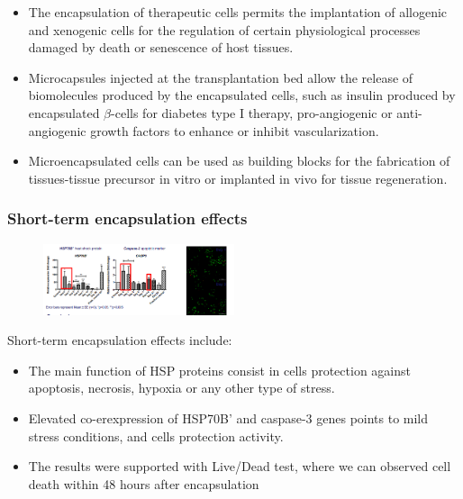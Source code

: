         \begin{multicols}{2}
            \begin{itemize}
                \item The encapsulation of therapeutic cells permits the implantation of allogenic and xenogenic cells for the regulation of certain physiological processes damaged by death or senescence of host tissues.
                \item Microcapsules injected at the transplantation bed allow the release of biomolecules produced by the encapsulated cells, such as insulin produced by encapsulated $\beta$-cells for diabetes type I therapy, pro-angiogenic or anti-angiogenic growth factors to enhance or inhibit vascularization.
                \item Microencapsulated cells can be used as building blocks for the fabrication of tissues-tissue precursor in vitro or implanted in vivo for tissue regeneration.
            \end{itemize}
        \end{multicols}

\subsubsection{Short-term encapsulation effects}

\begin{figure}[H]
        \centering
        \includegraphics[width=0.5\textwidth]{short_term.png}
        \caption{\label{fig:short_term}}
\end{figure}

Short-term encapsulation effects include:

\begin{multicols}{2}
    \begin{itemize}
        \item The main function of HSP proteins consist in cells protection against apoptosis, necrosis, hypoxia or any other type of stress.
        \item Elevated co-erexpression of HSP70B' and caspase-3 genes points to mild stress conditions, and cells protection activity.
        \item The results were supported with Live/Dead test, where we can observed cell death within 48 hours after encapsulation
    \end{itemize}
\end{multicols}

